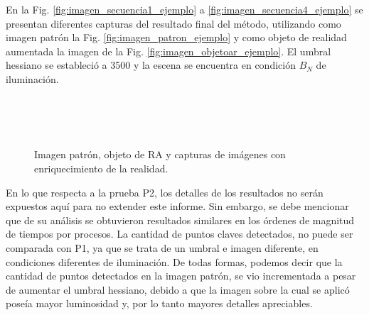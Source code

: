 En la Fig. \ref{fig:imagen_secuencia1_ejemplo} a \ref{fig:imagen_secuencia4_ejemplo} se presentan diferentes capturas del resultado final del método, utilizando como imagen patrón la Fig. \ref{fig:imagen_patron_ejemplo} y como objeto de realidad aumentada la imagen de la Fig. \ref{fig:imagen_objetoar_ejemplo}. El umbral hessiano se estableció a 3500 y la escena se encuentra en condición $B_{N}$ de iluminación.
\begin{figure}[tbhp]
\centering
{}
\\
\\
\\
\caption[Capturas de imágenes con enriquecimiento de la realidad]{Imagen patrón, objeto de RA y capturas de imágenes con enriquecimiento de la realidad.}
\label{fig:secuencia_ejemplo_BN}               %
\end{figure}

En lo que respecta a la prueba P2, los detalles de los resultados no serán expuestos aquí para no extender este informe. Sin embargo, se debe mencionar que de su análisis se obtuvieron resultados similares en los órdenes de magnitud de tiempos por procesos. La cantidad de puntos claves detectados, no puede ser comparada con P1, ya que se trata de un umbral e imagen diferente, en condiciones diferentes de iluminación. De todas formas, podemos decir que la cantidad de puntos detectados en la imagen patrón, se vio incrementada a pesar de aumentar el umbral hessiano, debido a que la imagen sobre la cual se aplicó poseía mayor luminosidad y, por lo tanto mayores detalles apreciables.

